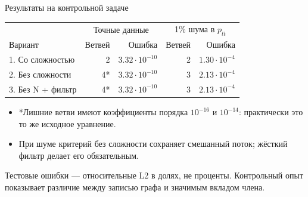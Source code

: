 \documentclass{beamer}
\begin{document}
\begin{frame}{Результаты на контрольной задаче}\small
\centering
\renewcommand{\arraystretch}{1.5}
\begin{tabular}{@{}lrrrr@{}}\toprule
 & \multicolumn{2}{c}{Точные данные} & \multicolumn{2}{c}{1\% шума в $p_{tt}$}\\
Вариант & Ветвей & Ошибка & Ветвей & Ошибка\\\midrule
1. Со сложностью & 2 & $3.32\cdot10^{-10}$ & 2 & $1.30\cdot10^{-4}$\\
2. Без сложности & 4* & $3.32\cdot10^{-10}$ & 3 & $2.13\cdot10^{-4}$\\
3. Без N + фильтр & 4* & $3.32\cdot10^{-10}$ & 3 & $2.13\cdot10^{-4}$\\\bottomrule
\end{tabular}\par\medskip
\begin{itemize}
\item *Лишние ветви имеют коэффициенты порядка $10^{-16}$ и $10^{-14}$:
практически это то же исходное уравнение.
\item При шуме критерий без сложности сохраняет смешанный поток;
жёсткий фильтр делает его обязательным.
\end{itemize}
\footnotesize Тестовые ошибки --- относительные L2 в долях, не проценты.
Контрольный опыт показывает различие между записью графа и значимым вкладом члена.
\end{frame}
\end{document}
